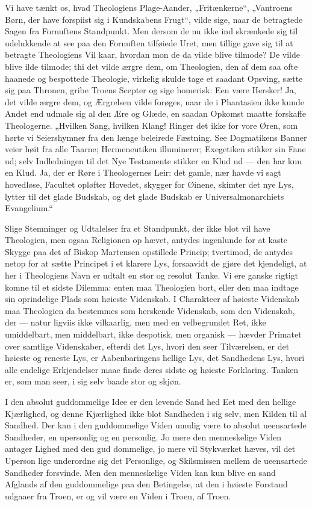\documentclass[12pt]{book}
\newcommand{\opage}[1]{\marginnote{\footnotesize\textit{[#1]}}}
\begin{document}
Vi have tænkt os, hvad Theologiens Plage-Aander,
„Fritænkerne“, „Vantroens Børn, der have forspiist sig i
Kundskabens Frugt“, vilde sige, naar de betragtede Sagen
fra Fornuftens Standpunkt. Men dersom de nu ikke ind\-%
skrænkede sig til udelukkende at see paa den Fornuften tilføiede
Uret, men tillige gave sig til at betragte Theologiens Vil\-%
kaar, hvordan mon de da vilde blive tilmode? De vilde
blive ilde tilmode; thi det vilde ærgre dem, om Theologien,
den af dem saa ofte haanede og bespottede Theologie, virkelig
skulde tage et saadant Opsving, sætte sig paa Thronen, gribe
Troens Scepter og sige homerisk: Een være Hersker! Ja,
det vilde ærgre dem, og Ærgrelsen vilde forøges, naar de i
Phantasien ikke kunde Andet end udmale sig al den Ære
og Glæde, en saadan Opkomst maatte forskaffe Theologerne.
„Hvilken Sang, hvilken Klang! Ringer det ikke for vore
Øren, som hørte vi Seiershymner fra den længe beleirede
Fæstning. See Dogmatikens Banner veier høit fra alle
Taarne; Hermeneutiken illuminerer; Exegetiken stikker sin
Fane ud; selv Indledningen til det Nye Testamente stikker
en Klud ud --- den har kun en Klud. Ja, der er Røre i
Theologernes Leir: det gamle, nær havde vi sagt hovedløse,
Facultet opløfter Hovedet, skygger for Øinene, skimter det
nye Lys, lytter til det glade Budskab, og det glade Budskab er
Universalmonarchiets Evangelium.“

\opage{4}\setcounter{footnote}{0}%
Slige Stemninger og Udtalelser fra et Standpunkt,
der ikke blot vil have Theologien, men ogsaa Religionen op\-%
hævet, antydes ingenlunde for at kaste Skygge paa det af
Biskop Martensen opstillede Princip; tvertimod, de antydes
netop for at sætte Principet i et klarere Lys, forsaavidt de
gjøre det kjendeligt, at her i Theologiens Navn er udtalt en
stor og resolut Tanke. Vi ere ganske rigtigt komne til et
sidste Dilemma: enten maa Theologien bort, eller den maa
indtage sin oprindelige Plads som høieste Videnskab. I
Charakteer af høieste Videnskab maa Theologien da bestemmes
som herskende Videnskab, som den Videnskab, der --- natur\-%
ligviis ikke vilkaarlig, men med en velbegrundet Ret, ikke
umiddelbart, men middelbart, ikke despotisk, men organisk ---
hævder Primatet over samtlige Videnskaber, efterdi det Lys,
hvori den seer Tilværelsen, er det høieste og reneste Lys, er
Aabenbaringens hellige Lys, det Sandhedens Lys, hvori alle
endelige Erkjendelser maae finde deres sidste og høieste
Forklaring. Tanken er, som man seer, i sig selv baade stor
og skjøn.

I den absolut guddommelige Idee er den levende Sand\-%
hed Eet med den hellige Kjærlighed, og denne Kjærlighed
ikke blot Sandheden i sig selv, men Kilden til al Sandhed.
Der kan i den guddommelige Viden umulig være to absolut
ueensartede Sandheder, en upersonlig og en personlig. Jo
mere den menneskelige Viden antager Lighed med den gud\-%
dommelige, jo mere vil Stykværket hæves, vil det Uperson\-%
lige underordne sig det Personlige, og Skilsmissen mellem
de ueensartede Sandheder forsvinde. Men den menneskelige
Viden kan kun blive en sand Afglands af den guddommelige
paa den Betingelse, at den i høieste Forstand udgaaer
fra Troen, er og vil være en Viden i Troen, af Troen.
\end{document}
